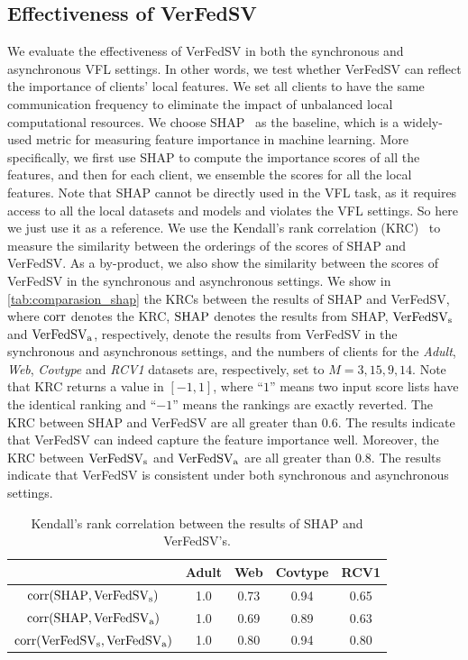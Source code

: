 \subsection{Effectiveness of VerFedSV} \label{sec:8.8.4}
We evaluate the effectiveness of VerFedSV in both the synchronous and asynchronous VFL settings. In other words, we test whether VerFedSV can reflect the importance of clients' local features. We set all clients to have the same communication frequency to eliminate the impact of unbalanced local computational resources. We choose SHAP~\cite{lundberg2017unified} as the baseline, which is a widely-used metric for measuring feature importance in machine learning. More specifically, we first use SHAP to compute the importance scores of all the features, and then for each client, we ensemble the scores for all the local features. Note that SHAP cannot be directly used in the VFL task, as it requires access to all the local datasets and models and violates the VFL settings. So here we just use it as a reference. We use the Kendall's rank correlation (KRC)~\cite{kendall1938new} to measure the similarity between the orderings of the scores of SHAP and VerFedSV. As a by-product, we also show the similarity between the scores of VerFedSV in the synchronous and asynchronous settings. We show in \autoref{tab:comparasion_shap} the KRCs between the results of SHAP and VerFedSV, where $\mathrm{corr}$ denotes the KRC, $\textrm{SHAP}$ denotes the results from SHAP, $\textrm{VerFedSV}_{\textrm{s}}$ and $\textrm{VerFedSV}_{\textrm{a}}$, respectively, denote the results from VerFedSV in the synchronous and asynchronous settings, and the numbers of clients for the \emph{Adult}, \emph{Web}, \emph{Covtype} and \emph{RCV1} datasets are, respectively, set to $M = 3, 15, 9, 14$. Note that KRC returns a value in $[-1, 1]$, where ``$1$'' means two input score lists have the identical ranking and ``$-1$'' means the rankings are exactly reverted. The KRC between SHAP and VerFedSV are all greater than $0.6$. The results indicate that VerFedSV can indeed capture the feature importance well. Moreover, the KRC between $\textrm{VerFedSV}_{\textrm{s}}$ and $\textrm{VerFedSV}_{\textrm{a}}$ are all greater than 0.8. The results indicate that VerFedSV is consistent under both synchronous and asynchronous settings.

\begin{table}[t]
    \centering
    \begin{tabular}{ccccc}
    \toprule
                                & Adult & Web   & Covtype   & RCV1\\ \midrule
    $\mathrm{corr}(\textrm{SHAP}, \textrm{VerFedSV}_{\textrm{s}})$    & 1.0   & 0.73  & 0.94      & 0.65\\
    $\mathrm{corr}(\textrm{SHAP}, \textrm{VerFedSV}_{\textrm{a}})$   & 1.0   & 0.69  & 0.89      & 0.63\\
    $\mathrm{corr}(\textrm{VerFedSV}_{\textrm{s}}, \textrm{VerFedSV}_{\textrm{a}})$    & 1.0   & 0.80  & 0.94      & 0.80\\
    \bottomrule
    \end{tabular}
    \caption{Kendall's rank correlation between the results of SHAP and VerFedSV's.}
    \label{tab:comparasion_shap}
\end{table}

